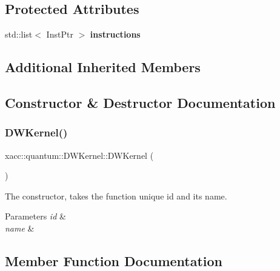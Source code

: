 \subsection*{Protected Attributes}
\begin{DoxyCompactItemize}
\item 
\mbox{\label{a00983_a38e434be6ef46a1ff43744632ae59ea8}} 
std\+::list$<$ Inst\+Ptr $>$ {\bfseries instructions}
\end{DoxyCompactItemize}
\subsection*{Additional Inherited Members}


\subsection{Constructor \& Destructor Documentation}
\mbox{\label{a00983_aadd3221d4787dd639e7e26006a7ca183}} 
\subsubsection{\texorpdfstring{D\+W\+Kernel()}{DWKernel()}}
{\footnotesize\ttfamily xacc\+::quantum\+::\+D\+W\+Kernel\+::\+D\+W\+Kernel (\begin{DoxyParamCaption}{ }\end{DoxyParamCaption})\hspace{0.3cm}{\ttfamily [inline]}}

The constructor, takes the function unique id and its name.


\begin{DoxyParams}{Parameters}
{\em id} & \\
\hline
{\em name} & \\
\hline
\end{DoxyParams}


\subsection{Member Function Documentation}
\mbox{\label{a00983_a4c3043d6971999c3a09e797fc55deb6c}} 
